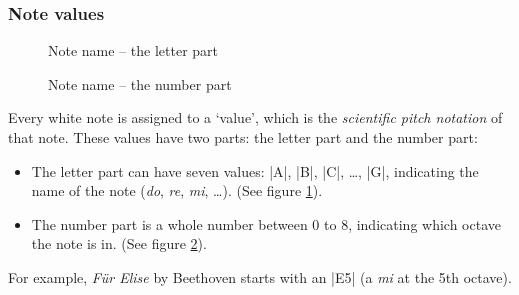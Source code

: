 \documentclass[11pt,a4paper]{ltxdoc}
\begin{document}
\subsubsection{Note values}\label{sec:music-notes:commands:note-values}
\begin{figure}[t]
  \centering
  \caption{Note name -- the letter part}
  \label{fig:music-notes:commands:note-values:letter}
\end{figure}
\begin{figure}[t]
  \centering
  \caption{Note name -- the number part}
  \label{fig:music-notes:commands:note-values:number}
\end{figure}
Every white note is assigned to a `value', which is the \emph{scientific pitch 
notation} of that note. These values have two parts: the letter part and the 
number part:
\begin{itemize}
  \item The letter part can have seven values: |A|, |B|, |C|, \dots, |G|, 
  indicating the name of the note (\emph{do}, \emph{re}, \emph{mi}, \dots). (See 
  figure \ref{fig:music-notes:commands:note-values:letter}).
  \item The number part is a whole number between $0$ to $8$, indicating which 
  octave the note is in. (See figure \ref{fig:music-notes:commands:note-values:number}).
\end{itemize}
For example, \emph{F\"ur Elise} by Beethoven starts with an |E5| (a \emph{mi} at the 
5th octave).
\end{document}
